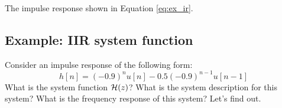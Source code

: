 \begin{marginfigure}
    \begin{center}
    \end{center}
    \caption{The impulse response shown in Equation \ref{eq:ex_ir}.}
    \label{fig:elementary_1st_h_ir}
\end{marginfigure}

\subsection{Example: IIR system function}

Consider an impulse response of the following form:
\begin{equation}
    h[n] = (-0.9)^n u[n] - 0.5(-0.9)^{n-1} u[n-1]
    \label{eq:ex_ir}
\end{equation}
What is the system function $\mathcal{H}(z)$? What is the system description for
this system? What is the frequency response of this system? Let's find out.

